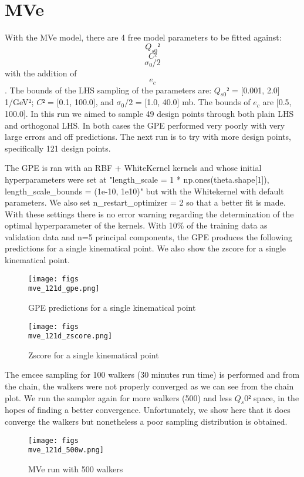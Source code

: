 \documentclass{article}
\begin{document}
\section{MVe}

With the MVe model, there are 4 free model parameters to be fitted against: $$Q_{s0}²$$ $$C²$$ $$\sigma_{0}/2$$ with the addition of $$e_c$$. The bounds of the LHS sampling of the parameters are: $Q_{s0}²$ = [0.001, 2.0] 1/GeV²; $C²$ = [0.1, 100.0], and $\sigma_{0}/2$ = [1.0, 40.0] mb. The bounds of $e_c$ are [0.5, 100.0]. In this run we aimed to sample 49 design points through both plain LHS and orthogonal LHS. In both cases the GPE performed very poorly with very large errors and off predictions. The next run is to try with more design points, specifically 121 design points.

The GPE is ran with an RBF + WhiteKernel kernels and whose initial hyperparameters were set at "length_scale = 1 * np.ones(theta.shape[1]), length_scale_bounds = (1e-10, 1e10)" but with the Whitekernel with default parameters. We also set n_restart_optimizer = 2 so that a better fit is made. With these settings there is no error warning regarding the determination of the optimal hyperparameter of the kernels. With 10\% of the training data as validation data and n=5 principal components, the GPE produces the following predictions for a single kinematical point. We also show  the zscore for a single kinematical point.

\begin{figure}[h]
\centering
\texttt{[image: figs\\mve\_121d\_gpe.png]}
\caption{GPE predictions for a single kinematical point}
\label{fig:mve_121d_gpe}
\end{figure}

\begin{figure}[h]
\centering
\texttt{[image: figs\\mve\_121d\_zscore.png]}
\caption{Zscore for a single kinematical point}
\label{fig:mve_121d_zscore}
\end{figure}

The emcee sampling for 100 walkers (30 minutes run time) is performed and from the chain, the walkers were not properly converged as we can see from the chain plot. We run the sampler again for more walkers (500) and less $Q_s0²$ space, in the hopes of finding a better convergence. Unfortunately, we show here that it does converge the walkers but nonetheless a poor sampling distribution is obtained. 

\begin{figure}[h]
\centering
\texttt{[image: figs\\mve\_121d\_500w.png]}
\caption{MVe run with 500 walkers}
\label{fig:mve_121d_500w}
\end{figure}
\end{document}
